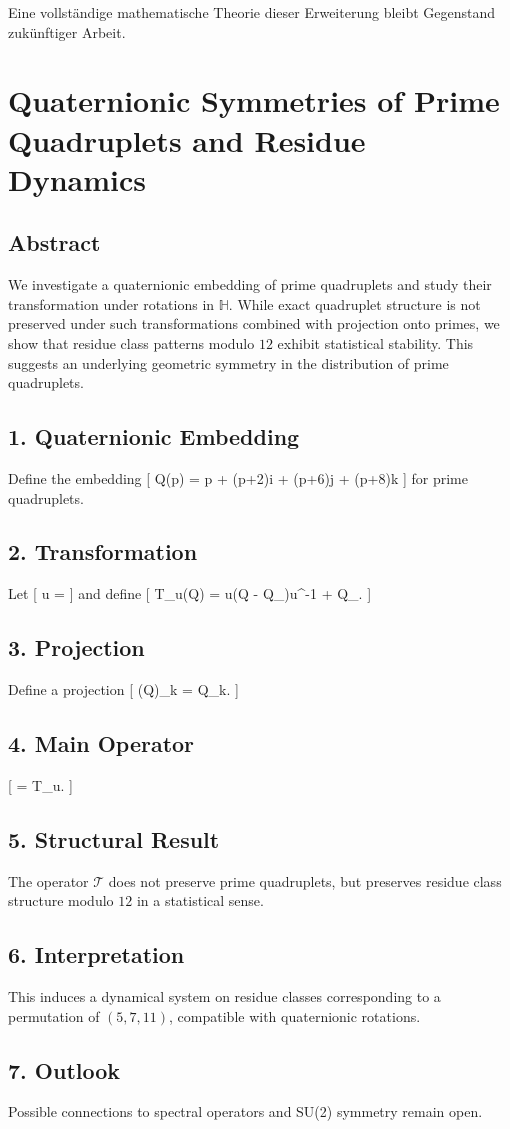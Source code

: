 \documentclass[11pt]{article}
\theoremstyle{definition}
\theoremstyle{plain}
\begin{document}
	Eine vollständige mathematische Theorie dieser Erweiterung bleibt Gegenstand zukünftiger Arbeit.
	
	\section*{Quaternionic Symmetries of Prime Quadruplets and Residue Dynamics}
	
	\subsection*{Abstract}
	We investigate a quaternionic embedding of prime quadruplets and study their transformation under rotations in $\mathbb{H}$. While exact quadruplet structure is not preserved under such transformations combined with projection onto primes, we show that residue class patterns modulo $12$ exhibit statistical stability. This suggests an underlying geometric symmetry in the distribution of prime quadruplets.
	
	\subsection*{1. Quaternionic Embedding}
	Define the embedding
	[
	Q(p) = p + (p+2)i + (p+6)j + (p+8)k
	]
	for prime quadruplets.
	
	\subsection*{2. Transformation}
	Let
	[
	u = 
	]
	and define
	[
	T_u(Q) = u(Q - Q_{})u^{-1} + Q_{}.
	]
	
	\subsection*{3. Projection}
	Define a projection
	[
	\Pi(Q)_k =  Q_k.
	]
	
	\subsection*{4. Main Operator}
	[
	 = \Pi \circ T_u.
	]
	
	\subsection*{5. Structural Result}
	The operator $\mathcal{T}$ does not preserve prime quadruplets, but preserves residue class structure modulo $12$ in a statistical sense.
	
	\subsection*{6. Interpretation}
	This induces a dynamical system on residue classes corresponding to a permutation of $(5,7,11)$, compatible with quaternionic rotations.
	
	\subsection*{7. Outlook}
	Possible connections to spectral operators and SU(2) symmetry remain open.
	
	
\end{document}
